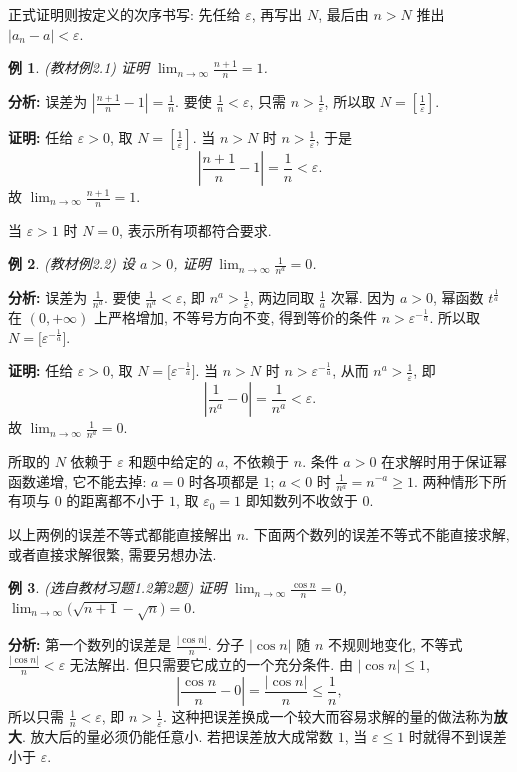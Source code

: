 \documentclass[UTF8,openany]{ctexbook}
\theoremstyle{chinesetextbook}
\newtheorem{example}{例}[section]
\newenvironment{cnproof}{\par\indent\textbf{证明:} \ignorespaces}{\par}
\begin{document}
正式证明则按定义的次序书写: 先任给 $\varepsilon$, 再写出 $N$, 最后由 $n>N$ 推出 $|a_n-a|<\varepsilon$.
\begin{example}\label{ex:2-1}
\textnormal{(教材例2.1)} 证明 $\displaystyle\lim_{n\to\infty}\frac{n+1}n=1$.
\end{example}
\par\indent\textbf{分析:} 误差为 $\displaystyle\left|\frac{n+1}n-1\right|=\frac1n$. 要使 $\displaystyle\frac1n<\varepsilon$, 只需 $\displaystyle n>\frac1\varepsilon$, 所以取 $\displaystyle N=\left[\frac1\varepsilon\right]$.
\begin{cnproof}
任给 $\varepsilon>0$, 取 $\displaystyle N=\left[\frac1\varepsilon\right]$. 当 $n>N$ 时 $\displaystyle n>\frac1\varepsilon$, 于是
\[
\left|\frac{n+1}n-1\right|=\frac1n<\varepsilon.
\]
故 $\displaystyle\lim_{n\to\infty}\frac{n+1}n=1$.
\end{cnproof}
当 $\varepsilon>1$ 时 $N=0$, 表示所有项都符合要求.
\begin{example}\label{ex:2-2}
\textnormal{(教材例2.2)} 设 $a>0$, 证明 $\displaystyle\lim_{n\to\infty}\frac1{n^a}=0$.
\end{example}
\par\indent\textbf{分析:} 误差为 $\displaystyle\frac1{n^a}$. 要使 $\displaystyle\frac1{n^a}<\varepsilon$, 即 $\displaystyle n^a>\frac1\varepsilon$, 两边同取 $\displaystyle\frac1a$ 次幂. 因为 $a>0$, 幂函数 $t^{\frac1a}$ 在 $(0,+\infty)$ 上严格增加, 不等号方向不变, 得到等价的条件 $n>\varepsilon^{-\frac1a}$. 所以取 $N=\bigl[\varepsilon^{-\frac1a}\bigr]$.
\begin{cnproof}
任给 $\varepsilon>0$, 取 $N=\bigl[\varepsilon^{-\frac1a}\bigr]$. 当 $n>N$ 时 $n>\varepsilon^{-\frac1a}$, 从而 $\displaystyle n^a>\frac1\varepsilon$, 即
\[
\left|\frac1{n^a}-0\right|=\frac1{n^a}<\varepsilon.
\]
故 $\displaystyle\lim_{n\to\infty}\frac1{n^a}=0$.
\end{cnproof}
所取的 $N$ 依赖于 $\varepsilon$ 和题中给定的 $a$, 不依赖于 $n$. 条件 $a>0$ 在求解时用于保证幂函数递增, 它不能去掉: $a=0$ 时各项都是 $1$; $a<0$ 时 $\displaystyle\frac1{n^a}=n^{-a}\ge1$. 两种情形下所有项与 $0$ 的距离都不小于 $1$, 取 $\varepsilon_0=1$ 即知数列不收敛于 $0$.

以上两例的误差不等式都能直接解出 $n$. 下面两个数列的误差不等式不能直接求解, 或者直接求解很繁, 需要另想办法.
\begin{example}\label{ex:h12-2}
\textnormal{(选自教材习题1.2第2题)} 证明 $\displaystyle\lim_{n\to\infty}\frac{\cos n}n=0$, $\displaystyle\lim_{n\to\infty}\bigl(\sqrt{n+1}-\sqrt n\bigr)=0$.
\end{example}
\par\indent\textbf{分析:} 第一个数列的误差是 $\displaystyle\frac{|\cos n|}n$. 分子 $|\cos n|$ 随 $n$ 不规则地变化, 不等式 $\displaystyle\frac{|\cos n|}n<\varepsilon$ 无法解出. 但只需要它成立的一个充分条件. 由 $|\cos n|\le1$,
\[
\left|\frac{\cos n}n-0\right|=\frac{|\cos n|}n\le\frac1n,
\]
所以只需 $\displaystyle\frac1n<\varepsilon$, 即 $\displaystyle n>\frac1\varepsilon$. 这种把误差换成一个较大而容易求解的量的做法称为\textbf{放大}. 放大后的量必须仍能任意小. 若把误差放大成常数 $1$, 当 $\varepsilon\le1$ 时就得不到误差小于 $\varepsilon$.
\end{document}
